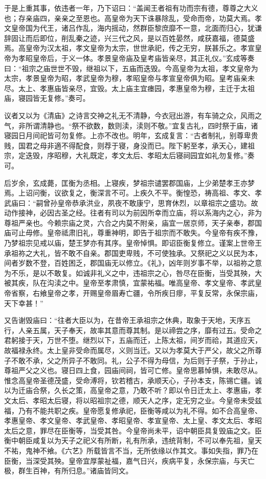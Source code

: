 \documentclass[]{article}
\begin{document}
于是上重其事，依违者一年，乃下诏曰：``盖闻王者祖有功而宗有德，尊尊之大义也；存亲庙四，亲亲之至恩也。高皇帝为天下诛暴除乱，受命而帝，功莫大焉。孝文皇帝国为代王，诸吕作乱，海内摇动，然群臣黎庶靡不一意，北面而归心，犹谦辞固让而后即位，削乱秦之迹，兴三代之风，是以百姓晏然，咸获嘉福，德莫盛焉。高皇帝为汉太祖，孝文皇帝为太宗，世世承祀，传之无穷，朕甚乐之。孝宣皇帝为孝昭皇帝后，于义一体。孝景皇帝庙及皇考庙皆亲尽，其正礼仪。''玄成等奏曰：``祖宗之庙世世不毁，继祖以下，五庙而迭毁。今高皇帝为太祖，孝文皇帝为太宗，孝景皇帝为昭，孝武皇帝为穆，孝昭皇帝与孝宣皇帝俱为昭。皇考庙亲未尽。太上、孝惠庙皆亲尽，宜毁。太上庙主宜瘗园，孝惠皇帝为穆，主迁于太祖庙，寝园皆无复修。''奏可。

议者又以为《清庙》之诗言交神之礼无不清静，今衣冠出游，有车骑之众，风雨之气，非所谓清静也。``祭不欲数，数则渎，渎则不敬。''宜复古礼，四时祭于庙，诸寝园日月间祀皆可勿复修。上亦不改也。明年，玄成复言：``古者制礼，别尊卑贵贱，国君之母非適不得配食，则荐于寝，身没而已。陛下躬至孝，承天心，建祖宗，定迭毁，序昭穆，大礼既定，孝文太后、孝昭太后寝祠园宜如礼勿复修。''奏可。

后岁余，玄成薨，匡衡为丞相。上寝疾，梦祖宗谴罢郡国庙，上少弟楚孝王亦梦焉。上诏问衡，议欲复之，衡深言不可。上疾久不平。衡惶恐，祷高祖、孝文、孝武庙曰：``嗣曾孙皇帝恭承洪业，夙夜不敢康宁，思育休烈，以章祖宗之盛功。故动作接神，必因古圣之经。往者有司以为前因所幸而立庙，将以系海内之心，非为尊祖严亲也。今赖宗庙之灵，六合之内莫不附亲，庙宜一居京师，天子亲奉，郡国庙可止毋修。皇帝祗肃旧礼，尊重神明，即告于祖宗而不敢失。今皇帝有疾不豫，乃梦祖宗见戒以庙，楚王梦亦有其序。皇帝悼惧。即诏臣衡复修立。谨案上世帝王承祖祢之大礼，皆不敢不自亲。郡国吏卑贱，不可使独承。又祭祀之义以民为本，间者岁数不登，百姓困乏，郡国庙无以修立。《礼》，凶年则岁事不举，以祖祢之意为不乐，是以不敢复。如诚非礼义之中，违祖宗之心，咎尽在臣衡，当受其殃，大被其疾，队在沟渎之中。皇帝至孝肃慎，宜蒙祐福。唯高皇帝、孝文皇帝、孝武皇帝省察，右飨皇帝之孝，开赐皇帝眉寿亡疆，令所疾日瘳，平复反常，永保宗庙，天下幸甚！''

又告谢毁庙曰：``往者大臣以为，在昔帝王承祖宗之休典，取象于天地，天序五行，人亲五属，天子奉天，故率其意而尊其制。是以禘尝之序，靡有过五。受命之君躬接于天，万世不堕。继烈以下，五庙而迁，上陈太祖，间岁而祫，其道应天，故福禄永终。太上皇非受命而属尽，义则当迁。又以为孝莫大于严父，故父之所尊子不敢不承，父之所异子不敢同。礼，公子不得为母信，为后则于子祭，于孙止，尊祖严父之义也。寝日四上食，园庙间祠，皆可亡修。皇帝思慕悼惧，未敢尽从。惟念高皇帝圣德茂盛，受命溥将，钦若稽古，承顺天心，子孙本支，陈锡亡疆。诚以为迁庙合祭，久长之策，高皇帝之意，乃敢不听？即以令日迁太上、孝惠庙，孝文太后、孝昭太后寝，将以昭祖宗之德，顺天人之序，定无穷之业。今皇帝未受兹福，乃有不能共职之疾。皇帝愿复修承祀，臣衡等咸以为礼不得。如不合高皇帝、孝惠皇帝、孝文皇帝、孝武皇帝、孝昭皇帝、孝宣皇帝、太上皇、孝文太后、孝昭太后之意，罪尽在臣衡等，当受其咎。今皇帝尚未平，诏中朝臣具复毁庙之文。臣衡中朝臣咸复以为天子之祀义有所断，礼有所承，违统背制，不可以奉先祖，皇天不祐，鬼神不飨。《六艺》所载皆言不当，无所依缘以作其文。事如失指，罪乃在臣衡，当深受其殃。皇帝宜厚蒙祉福，嘉气日兴，疾病平复，永保宗庙，与天亡极，群生百神，有所归息。''诸庙皆同文。
\end{document}

